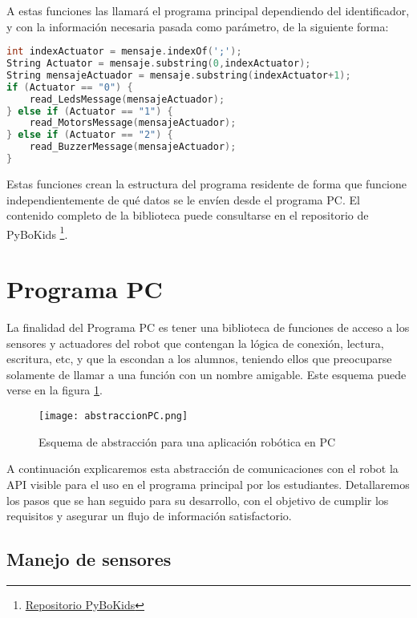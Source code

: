 A estas funciones las llamará el programa principal dependiendo del identificador, y con la información necesaria pasada como parámetro, de la siguiente forma:

\begin{lstlisting}[language=C,caption={Decisión sobre los actuadores con el primer valor del mensaje}]
int indexActuator = mensaje.indexOf(';');
String Actuator = mensaje.substring(0,indexActuator);
String mensajeActuador = mensaje.substring(indexActuator+1);
if (Actuator == "0") {
	read_LedsMessage(mensajeActuador);
} else if (Actuator == "1") {
	read_MotorsMessage(mensajeActuador);
} else if (Actuator == "2") {
	read_BuzzerMessage(mensajeActuador);
}
\end{lstlisting}

Estas funciones crean la estructura del programa residente de forma que funcione independientemente de qué datos se le envíen desde el programa PC. El contenido completo de la biblioteca puede consultarse en el repositorio de PyBoKids  \footnote{\href{https://github.com/JdeRobot/PyBoKids}{Repositorio PyBoKids}}.\\

\section{Programa PC}\label{sec:pc}
La finalidad del Programa PC es tener una biblioteca de funciones de acceso a los sensores y actuadores del robot que contengan la lógica de conexión, lectura, escritura, etc, y que la escondan a los alumnos, teniendo ellos que preocuparse solamente de llamar a una función con un nombre amigable. Este esquema puede verse en la figura \ref{img:abstraccionPC}.

\begin{figure}[h]
	\texttt{[image: abstraccionPC.png]}
	\centering
	\caption{Esquema de abstracción para una aplicación robótica en PC}
	\label{img:abstraccionPC}
\end{figure}

A continuación explicaremos esta abstracción de comunicaciones con el robot la API visible para el uso en el programa principal por los estudiantes. Detallaremos los pasos que se han seguido para su desarrollo, con el objetivo de cumplir los requisitos y asegurar un flujo de información satisfactorio.

\subsection{Manejo de sensores}\label{subsec:sensoresPython}

